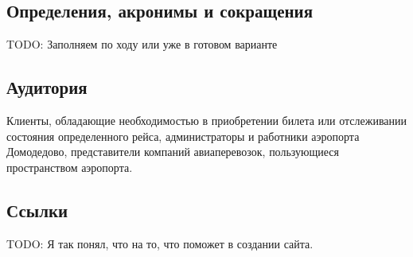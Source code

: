 \documentclass{article}
\begin{document}
\subsection{Определения, акронимы и сокращения}

TODO: Заполняем по ходу или уже в готовом варианте

\subsection{Аудитория}

Клиенты, обладающие необходимостью в приобретении 
билета или отслеживании состояния определенного 
рейса, администраторы и работники аэропорта 
Домодедово, представители компаний авиаперевозок, 
пользующиеся пространством аэропорта.

\subsection{Ссылки}

TODO: Я так понял, что на то, что поможет в 
создании сайта.
\end{document}
